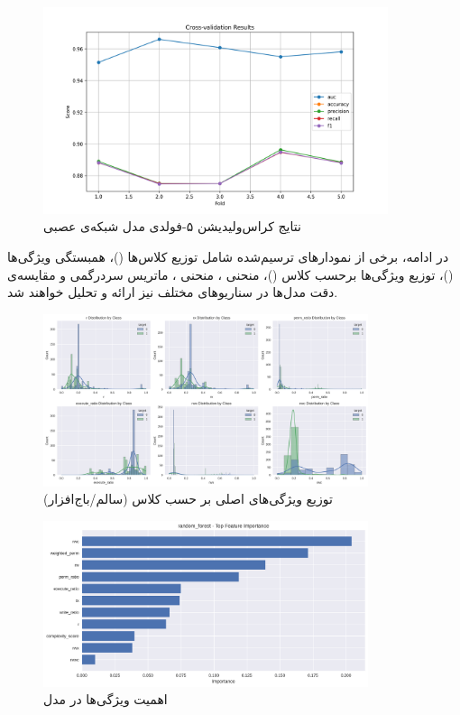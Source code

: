 \begin{figure}
    \centering
    \includegraphics[width=0.9\textwidth]{images/neural_net_cv_results.png}
    \caption{نتایج کراس‌ولیدیشن ۵-فولدی مدل شبکه‌ی عصبی}
    \label{fig:neural_net_cv}
\end{figure}

در ادامه، برخی از نمودارهای ترسیم‌شده شامل توزیع کلاس‌ها ()، همبستگی ویژگی‌ها ()، توزیع ویژگی‌ها برحسب کلاس ()، منحنی ، منحنی ، ماتریس سردرگمی و مقایسه‌ی دقت مدل‌ها در سناریوهای مختلف نیز ارائه و تحلیل خواهند شد.

\begin{figure}
    \centering
    \includegraphics[width=0.85\textwidth]{images/top_feature_distributions.png}
    \caption{توزیع ویژگی‌های اصلی بر حسب کلاس (سالم/باج‌افزار)}
    \label{fig:class_dist}
\end{figure}

\begin{figure}
    \centering
    \includegraphics[width=0.85\textwidth]{images/random_forest_feature_importance.png}
    \caption{اهمیت ویژگی‌ها در مدل }
    \label{fig:feature_importance}
\end{figure}


